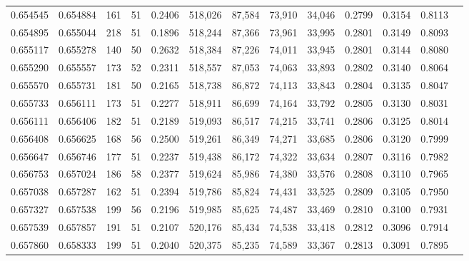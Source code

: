 \begin{tabular}{rrrrrrrrrrrrr}
0.654545 & 0.654884 &    161 &    51 &                                     0.2406 & 518,026 &  87,584 &  73,910 &  34,046 & 0.2799 & 0.3154 & 0.8113 \\
0.654895 & 0.655044 &    218 &    51 &                                     0.1896 & 518,244 &  87,366 &  73,961 &  33,995 & 0.2801 & 0.3149 & 0.8093 \\
0.655117 & 0.655278 &    140 &    50 &                                     0.2632 & 518,384 &  87,226 &  74,011 &  33,945 & 0.2801 & 0.3144 & 0.8080 \\
0.655290 & 0.655557 &    173 &    52 &                                     0.2311 & 518,557 &  87,053 &  74,063 &  33,893 & 0.2802 & 0.3140 & 0.8064 \\
0.655570 & 0.655731 &    181 &    50 &                                     0.2165 & 518,738 &  86,872 &  74,113 &  33,843 & 0.2804 & 0.3135 & 0.8047 \\
0.655733 & 0.656111 &    173 &    51 &                                     0.2277 & 518,911 &  86,699 &  74,164 &  33,792 & 0.2805 & 0.3130 & 0.8031 \\
0.656111 & 0.656406 &    182 &    51 &                                     0.2189 & 519,093 &  86,517 &  74,215 &  33,741 & 0.2806 & 0.3125 & 0.8014 \\
0.656408 & 0.656625 &    168 &    56 &                                     0.2500 & 519,261 &  86,349 &  74,271 &  33,685 & 0.2806 & 0.3120 & 0.7999 \\
0.656647 & 0.656746 &    177 &    51 &                                     0.2237 & 519,438 &  86,172 &  74,322 &  33,634 & 0.2807 & 0.3116 & 0.7982 \\
0.656753 & 0.657024 &    186 &    58 &                                     0.2377 & 519,624 &  85,986 &  74,380 &  33,576 & 0.2808 & 0.3110 & 0.7965 \\
0.657038 & 0.657287 &    162 &    51 &                                     0.2394 & 519,786 &  85,824 &  74,431 &  33,525 & 0.2809 & 0.3105 & 0.7950 \\
0.657327 & 0.657538 &    199 &    56 &                                     0.2196 & 519,985 &  85,625 &  74,487 &  33,469 & 0.2810 & 0.3100 & 0.7931 \\
0.657539 & 0.657857 &    191 &    51 &                                     0.2107 & 520,176 &  85,434 &  74,538 &  33,418 & 0.2812 & 0.3096 & 0.7914 \\
0.657860 & 0.658333 &    199 &    51 &                                     0.2040 & 520,375 &  85,235 &  74,589 &  33,367 & 0.2813 & 0.3091 & 0.7895 \\

\end{tabular}
